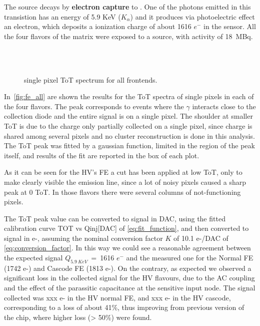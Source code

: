 The  source decays by \textbf{electron capture} to . One of the photons emitted in this transistion has an energy of 5.9 KeV ($K_{\alpha}$) and it produces via photoelectric effect an electron, which deposits a ionization charge of about 1616 $e^{-}$ in the sensor. 
All the four flavors of the matrix were exposed to a  source, with activity of \SI{18}{MBq}. 
\begin{figure}[h]
\centering
{}\quad
{}\\
\quad
{}\\
\caption{ single pixel ToT spectrum for all frontends.}
\label{fig:fe_all}
\end{figure}
In~\autoref{fig:fe_all} are shown the results for the ToT spectra of single pixels in each of the four flavors. The peak corresponds to events where the $\gamma$ interacts close to the collection diode and the entire signal is on a single pixel. The shoulder at smaller ToT is due to the charge only partially collected on a single pixel, since charge is shared among several pixels and no cluster reconstruction is done in this analysis. The ToT peak was fitted by a gaussian function, limited in the region of the peak itself, and results of the fit are reported in the box of each plot.  

As it can be seen for the HV's FE a cut has been applied at low ToT, only to make clearly visible the emission line, since a lot of noisy pixels caused a sharp peak at 0 ToT. In those flavors there were several columns of not-functioning pixels. 

The ToT peak value can be converted to signal in DAC, using the fitted calibration curve TOT vs Qinj[DAC] of \autoref{eq:fit_function}, and then converted to signal in e-, assuming the nominal conversion factor $K$ of 10.1 e-/DAC of \autoref{eq:conversion_factor}. In this way we could see a reasonable agreement between the expected signal $Q_{\SI{5.9}{KeV}}$~=~1616 $e^{-}$ and the measured one for the Normal FE (1742 e-) and Cascode FE (1813 e-). On the contrary, as expected   we observed a significant loss in the collected signal for the HV flavours, due to the AC coupling and the effect of the parassitic capacitance at the sensitive input node. The signal collected was xxx e-  in the HV normal FE,  and xxx e-  in the HV cascode, corresponding to a loss of about 41\%, thus improving from previous version of the chip,  where higher loss (> 50\%) were found. 

